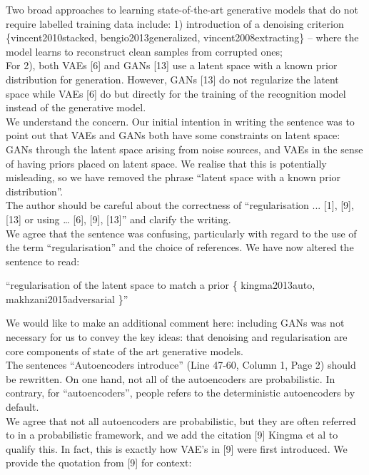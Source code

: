 \documentclass{article}
\begin{document}
Two broad approaches to learning state-of-the-art generative models that do not require labelled training data include: 1) introduction of a denoising criterion \{vincent2010stacked, bengio2013generalized,  vincent2008extracting\} -- where the model learns to reconstruct clean samples from corrupted ones;\\

{\color{blue} For 2), both VAEs [6] and GANs [13] use a latent space with a known prior distribution for generation. However, GANs [13] do not regularize the latent space while VAEs [6] do but directly for the training of the recognition model instead of the generative model.}\\

We understand the concern. Our initial intention in writing the sentence was to point out that VAEs and GANs both have some constraints on latent space: GANs through the latent space arising from noise sources, and VAEs in the sense of having priors placed on latent space. We realise that this is potentially misleading, so we have removed the phrase ``latent space with a known prior distribution''. \\

{\color{blue} The author should be careful about the correctness of ``regularisation ... [1], [9], [13] or using … [6], [9], [13]'' and clarify the writing.} \\

We agree that the sentence was confusing, particularly with regard to the use of the term ``regularisation'' and the choice of references. We have now altered the sentence to read:

``regularisation of the latent space to match a prior {\color{red} \{ kingma2013auto, makhzani2015adversarial \}}''

We would like to make an additional comment here: including GANs was not necessary for us to convey the key ideas: that denoising and regularisation are core components of state of the art generative models. \\


{\color{blue}
The sentences ``Autoencoders introduce'' (Line 47-60, Column 1, Page 2) should be rewritten. On one hand, not all of the autoencoders are probabilistic. In contrary, for ``autoencoders'', people refers to the deterministic autoencoders by default.}\\

We agree that not all autoencoders are probabilistic, but they are often referred to in a probabilistic framework, and we add the citation [9] Kingma et al to qualify this. In fact, this is exactly how VAE's in [9] were first introduced.  We provide the quotation from [9] for context:
    
\end{document}
